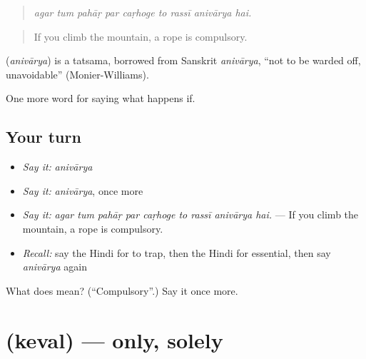 \begin{quote}
        
\end{quote}

\begin{quote}
\emph{agar tum pahāṛ par caṛhoge to rassī anivārya hai.}
\end{quote}

\begin{quote}
If you climb the mountain, a rope is compulsory.
\end{quote}

\begin{cousinweb}
\textbf{} (\emph{anivārya}) is a tatsama, borrowed from Sanskrit \emph{anivārya}, \textquotedblleft{}not to be warded off, unavoidable\textquotedblright{} (Monier-Williams).
\end{cousinweb}

\begin{grammarlens}[title={What you've built}]
One more word for saying what happens if.
\end{grammarlens}

\subsection*{Your turn}
\begin{itemize}
\raggedright
  \item \emph{Say it:} \emph{anivārya}
  \item \emph{Say it:} \emph{anivārya}, once more
  \item \emph{Say it:} \emph{agar tum pahāṛ par caṛhoge to rassī anivārya hai.} — If you climb the mountain, a rope is compulsory.
  \item \emph{Recall:} say the Hindi for to trap, then the Hindi for essential, then say \emph{anivārya} again
\end{itemize}

\begin{tcolorbox}[breakable,colback=teal!4,colframe=teal!35!black,title={Before you move on}]
What does  mean? (\textquotedblleft{}Compulsory\textquotedblright{}.) Say it once more.
\end{tcolorbox}
\section[\texorpdfstring{\hi{केवल} (keval)}{केवल (keval)}]{ (keval) — only, solely}

